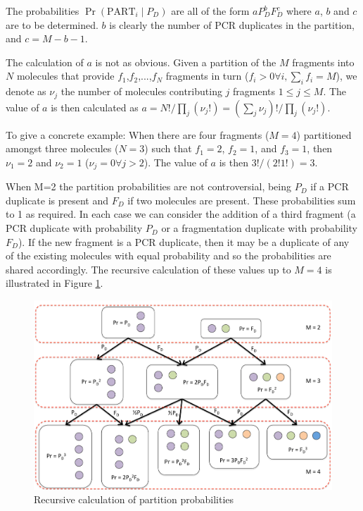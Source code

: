 \documentclass{article}
\begin{document}
The probabilities $\Pr(\text{PART}_i \mid P_D)$ are all of the form $aP_D^bF_D^c$ where $a$, $b$ and $c$ are to be determined. $b$ is clearly the number of PCR duplicates in the partition, and $c = M - b - 1$. 

The calculation of $a$ is not as obvious. Given a partition of the $M$ fragments into $N$ molecules that provide $f_1$,$f_2$,...,$f_N$ fragments in turn ($f_i > 0 \forall i, \sum_i f_i = M$), we denote as $\nu_j$ the number of molecules contributing $j$ fragments $1 \leq j \leq M$. The value of $a$ is then calculated as $a = N!/\prod_j \left( \nu_j! \right) = \left( \sum_j  \nu_j \right)!/\prod_j \left( \nu_j! \right)$. 

To give a concrete example: When there are four fragments ($M = 4$) partitioned amongst three molecules ($N=3$) such that $f_1 = 2$, $f_2 = 1$, and $f_3 = 1$, then  $\nu_1 = 2$  and $\nu_2 = 1$ ($\nu_j =0 \forall j>2$). The value of $a$ is then $3!/(2!1!)=3$.

When M=2 the partition probabilities are not controversial, being $P_D$ if a PCR duplicate is present and $F_D$ if two molecules are present. These probabilities sum to 1 as required. In each case we can consider the addition of a third fragment (a PCR duplicate with probability $P_D$ or a fragmentation duplicate with probability $F_D$). If the new fragment is a PCR duplicate, then it may be a duplicate of any of the existing molecules with equal probability and so the probabilities are shared accordingly. The recursive calculation of these values up to $M=4$ is illustrated in Figure \ref{probderive}.




\begin{figure}[t]
\begin{center}
\includegraphics[width=\textwidth]{probderive.pdf}
\end{center}
\caption{Recursive calculation of partition probabilities}
\label{probderive}
\end{figure}
\end{document}
